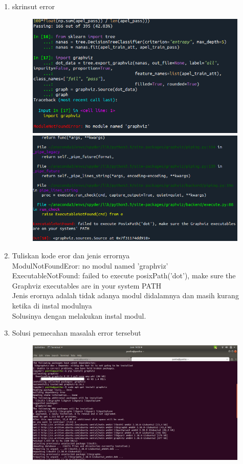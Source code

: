 \begin{enumerate}
	\item
skrinsut error
\begin{figure}[!htbp]
		\centering
		\includegraphics[scale=0.4]{figures/chapter2/instalgravis.png}
		\includegraphics[scale=0.5]{figures/chapter2/setelah instal gravis ttep.png}
	\end{figure}
\newpage
	\item
Tuliskan kode eror dan jenis errornya\\
ModulNotFoundEror: no modul named 'graphviz'\\
ExecutableNotFound: failed to execute posixPath('dot'), make sure the Graphviz executables are in your system PATH\\
Jenis erornya adalah tidak adanya modul didalamnya dan masih kurang ketika di instal modulnya\\
Solusinya dengan melakukan instal modul.
	\item
Solusi pemecahan masalah error tersebut
\begin{figure}[!htbp]
		\centering
		\includegraphics[scale=0.4]{figures/chapter2/ketikaerortidak terdapatmodulgrafis.png}

\end{figure}
\end{enumerate}
